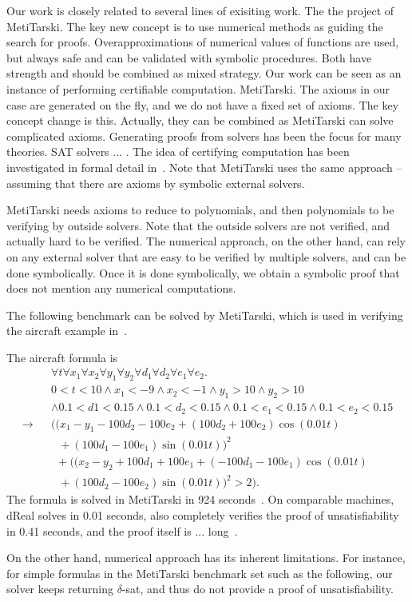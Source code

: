 \documentclass[envcountsect]{llncs}
\begin{document}
Our work is closely related to several lines of exisiting work. The the
project of MetiTarski. The key new concept is to use numerical methods as
guiding the search for proofs. Overapproximations of numerical values of
functions are used, but always safe and can be validated with symbolic
procedures. Both have strength and should be combined as mixed strategy. Our
work can be seen as an instance of performing certifiable computation.
MetiTarski. The axioms in our case are generated on the fly, and we do not have
a fixed set of axioms. The key concept change is this. Actually, they can be
combined as MetiTarski can solve
complicated axioms. 
Generating proofs from solvers has been the focus for
many theories. SAT solvers ... . The idea of certifying computation has been
investigated in formal detail in~\cite{}. Note that MetiTarski uses the same
approach -- assuming that there are axioms by symbolic external solvers. 

MetiTarski needs axioms to reduce to polynomials, and then polynomials to be
verifying by outside solvers. Note that the outside solvers are not verified,
and actually hard to be verified. The numerical approach, on the other hand,
can rely on any external solver that are easy to be verified by multiple
solvers, and can be done symbolically. Once it is done symbolically, we obtain
a symbolic proof that does not mention any numerical computations. 

The following benchmark can be solved by MetiTarski, which is used in verifying
the aircraft example in~\cite{}. 
\begin{example}[Aircraft]
The aircraft formula is
\begin{eqnarray*}
& &\forall t \forall x_1\forall x_2 \forall y_1\forall y_2\forall
d_1\forall d_2\forall e_1\forall e_2. \\
& &0<t<10\wedge x_1<-9 \wedge x_2<-1\wedge
y_1>10 \wedge y_2>10\\
& & \wedge 0.1<d1< 0.15\wedge 0.1<d_2<0.15 \wedge
0.1<e_1<0.15\wedge 0.1<e_2<0.15 \\
\rightarrow & &\Big(
\Big(x_1-y_1-100d_2-100e_2+(100d_2+100e_2)\cos(0.01t)\\
& &\ \ \ + (100d_1
-100e_1)\sin(0.01t)\Big)^2\\
& & \ \ +\Big((x_2-y_2+100d_1+100e_1+(-100d_1-100e_1)\cos(0.
0 1 t ) \\
& &\ \ \  + (100d_2 - 100e_2)\sin(0.01t)\Big)^2 > 2\Big).
\end{eqnarray*}
The formula is solved in MetiTarski in 924
seconds~\cite{}. On comparable machines, dReal solves in 0.01 seconds, also
completely verifies the proof of unsatisfiability in 0.41 seconds, and the
proof itself is ... long~\cite{}. 
\end{example}
On the other hand, numerical approach has its inherent limitations. For
instance, for simple formulas in the MetiTarski benchmark set such as the
following, our solver keeps returning $\delta$-sat, and thus do not provide a
proof of unsatisfiability. 
\begin{example}
 
\end{example}
\end{document}
